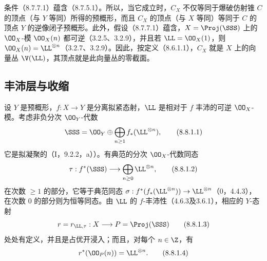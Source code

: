 条件（8.7.7.1）蕴含（8.7.5.1）。所以，当它成立时，$C_X$ 不仅等同于爆破仿射锥 $C$ 的顶点（与 $Y$ 等同）所得的预概形，而且 $C_X$ 的顶点（与 $X$ 等同）等同于 $C$ 的顶点 $Y$ 的逆像闭子预概形。此外，假设（8.7.7.1）蕴含，$X=\Proj(\SSS)$ 上的 $\OO_X$-模 $\OO_X(n)$ 都可逆（3.2.5、3.2.9），并且若 $\LL=\OO_X(1)$，则 $\OO_X(n)=\LL^{\otimes n}$（3.2.7、3.2.9）。因此，按定义（8.6.1.1），$C_X$ 就是 $X$ 上的向量丛 $\V(\LL)$，其顶点就是此向量丛的零截面。

\subsection{丰沛层与收缩}

 设 $Y$ 是预概形，$f:X\to Y$ 是分离拟紧态射，$\LL$ 是相对于 $f$ 丰沛的可逆 $\OO_X$-模。考虑非负分次 $\OO_Y$-代数
\begin{equation}\SSS=\OO_Y\oplus\bigoplus_{n\geq1}f_*(\LL^{\otimes n}),\tag{8.8.1.1}\end{equation}
它是拟凝聚的（I，9.2.2，a））。有典范的分次 $\OO_X$-代数同态
\begin{equation}\tau:f^*(\SSS)\longrightarrow\bigoplus_{n\geq0}\LL^{\otimes n},\tag{8.8.1.2}\end{equation}
在次数 $\geq1$ 的部分，它等于典范同态 $\sigma:f^*(f_*(\LL^{\otimes n}))\to\LL^{\otimes n}$（0，4.4.3），在次数 $0$ 的部分则为恒等同态。由 $\LL$ 的 $f$-丰沛性（4.6.3及3.6.1），相应的 $Y$-态射
\begin{equation}r=r_{\LL,\tau}:X\longrightarrow P=\Proj(\SSS)\tag{8.8.1.3}\end{equation}
处处有定义，并且是占优开浸入；而且，对每个 $n\in\Z$，有
\begin{equation}r^*(\OO_P(n))=\LL^{\otimes n}.\tag{8.8.1.4}\end{equation}

